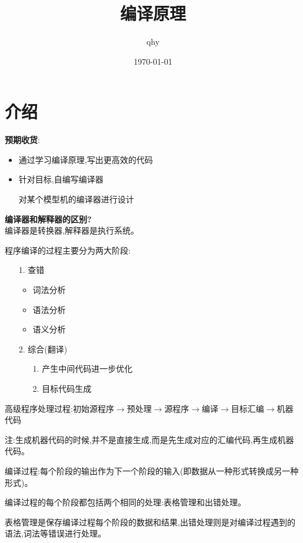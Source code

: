 \documentclass[UTF8,a4paper]{ctexart}
\author{ qhy }
\date{\today}
\title{编译原理}
\newcommand{\spaceline}{\vspace{\baselineskip}}
\begin{document}
  \maketitle
  \tableofcontents
  \newpage

  \section{介绍}

  \textbf{预期收货}:
  \begin{itemize}
    \item 通过学习编译原理,写出更高效的代码
    \item 针对目标,自编写编译器

    对某个模型机的编译器进行设计
  \end{itemize}

  \textbf{编译器和解释器的区别?}\\
  编译器是转换器,解释器是执行系统。

  \spaceline

  程序编译的过程主要分为两大阶段:
  \begin{itemize}
    \item [1.] 查错
    \begin{itemize}
      \item 词法分析
      \item 语法分析
      \item 语义分析
    \end{itemize}

    \item [2.] 综合(翻译)
    \begin{itemize}
      \item [1.] 产生中间代码进一步优化
      \item [2.] 目标代码生成
    \end{itemize}
  \end{itemize}

  高级程序处理过程:初始源程序$\to$预处理$\to$源程序$\to$编译$\to$目标汇编$\to$机器代码

  注:生成机器代码的时候,并不是直接生成,而是先生成对应的汇编代码,再生成机器代码。

  编译过程:每个阶段的输出作为下一个阶段的输入(即数据从一种形式转换成另一种形式)。

  编译过程的每个阶段都包括两个相同的处理:表格管理和出错处理。

  表格管理是保存编译过程每个阶段的数据和结果,出错处理则是对编译过程遇到的语法,词法等错误进行处理。
\end{document}

